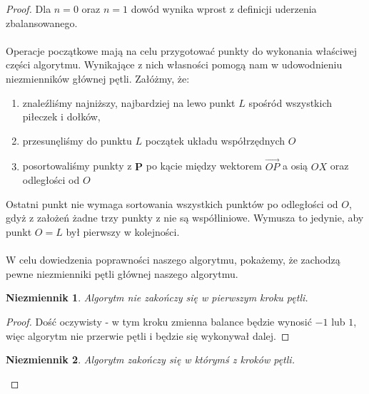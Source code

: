 \documentclass[10pt,a4paper]{article}
\newtheorem{invariant}{Niezmiennik}
\begin{document}
	\begin{proof}
		Dla $n = 0$ oraz $n = 1$ dowód wynika wprost z definicji uderzenia zbalansowanego. \\~\\
		Operacje początkowe mają na celu przygotować punkty do wykonania właściwej części algorytmu. Wynikające z nich własności pomogą nam w udowodnieniu niezmienników głównej pętli. Załóżmy, że:
		\begin{enumerate}
			\item znaleźliśmy najniższy, najbardziej na lewo punkt $L$ spośród wszystkich piłeczek i dołków, 
			\item przesunęliśmy do punktu $L$ początek układu współrzędnych $O$
			\item posortowaliśmy punkty z $\mathbf{P}$ po kącie między wektorem $\overrightarrow{OP}$ a osią $OX$ oraz odległości od $O$
		\end{enumerate}
		Ostatni punkt nie wymaga sortowania wszystkich punktów po odległości od $O$, gdyż z założeń żadne trzy punkty z nie są współliniowe. Wymusza to jedynie, aby punkt $O = L$ był pierwszy w kolejności. \\~\\
		W celu dowiedzenia poprawności naszego algorytmu, pokażemy, że zachodzą pewne niezmienniki pętli głównej naszego algorytmu.

		\begin{addmargin}[1.25em]{0em}
			\begin{invariant} \label{invariant:1}
				Algorytm nie zakończy się w pierwszym kroku pętli.
			\end{invariant}
			
			\begin{proof}
				Dość oczywisty - w tym kroku zmienna balance będzie wynosić $-1$ lub $1$, więc algorytm nie przerwie pętli i będzie się wykonywał dalej. 
			\end{proof}
			
			\vspace{1em}
			
			\begin{invariant} \label{invariant:2}
				Algorytm zakończy się w którymś z kroków pętli.
			\end{invariant}
			

\end{addmargin}
\end{proof}
\end{document}
